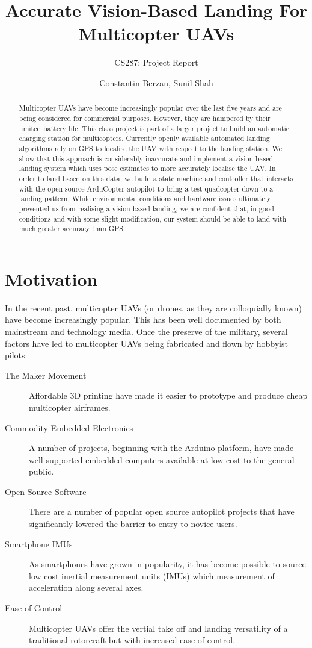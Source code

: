 \documentclass[10pt]{scrartcl} %
\title{Accurate Vision-Based Landing For Multicopter UAVs}
\subtitle{CS287: Project Report}
\author{Constantin Berzan, Sunil Shah}
\date{}
\begin{document}
\maketitle

\begin{abstract}
Multicopter UAVs have become increasingly popular over the last five years and are being considered for commercial purposes. However, they are hampered by their limited battery life. This class project is part of a larger project to build an automatic charging station for multicopters. Currently openly available automated landing algorithms rely on GPS to localise the UAV with respect to the landing station. We show that this approach is considerably inaccurate and implement a vision-based landing system which uses pose estimates to more accurately localise the UAV. 
In order to land based on this data, we build a state machine and controller that interacts with the open source ArduCopter autopilot to bring a test quadcopter down to a landing pattern. While environmental conditions and hardware issues ultimately prevented us from realising a vision-based landing, we are confident that, in good conditions and with some slight modification, our system should be able to land with much greater accuracy than GPS.
\end{abstract}
\section{Motivation}
In the recent past, multicopter UAVs (or drones, as they are colloquially known) have become increasingly popular. This has been well documented by both mainstream and technology media. Once the preserve of the military, several factors have led to multicopter UAVs being fabricated and flown by hobbyist pilots:
\begin{description}
\item[The Maker Movement]{Affordable 3D printing have made it easier to prototype and produce cheap multicopter airframes.}
\item[Commodity Embedded Electronics]{A number of projects, beginning with the Arduino platform, have made well supported embedded computers available at low cost to the general public.}
\item[Open Source Software]{There are a number of popular open source autopilot projects that have significantly lowered the barrier to entry to novice users.}
\item[Smartphone IMUs]{As smartphones have grown in popularity, it has become possible to source low cost inertial measurement units (IMUs) which measurement of acceleration along several axes.}
\item[Ease of Control]{Multicopter UAVs offer the vertial take off and landing versatility of a traditional rotorcraft but with increased ease of control.}
\end{description}
\end{document}
